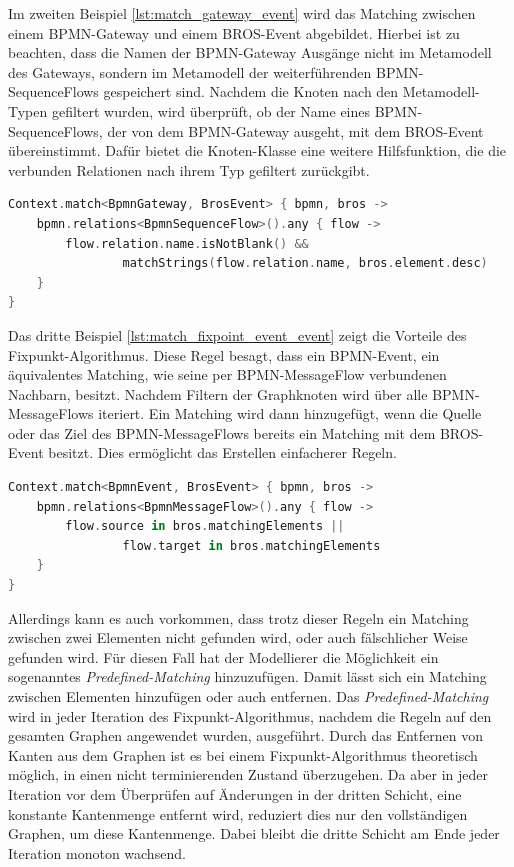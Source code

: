 Im zweiten Beispiel \cref{lst:match_gateway_event} wird das Matching zwischen einem BPMN-Gateway und einem BROS-Event abgebildet.
Hierbei ist zu beachten, dass die Namen der BPMN-Gateway Ausgänge nicht im Metamodell des Gateways, sondern im Metamodell der weiterführenden BPMN-SequenceFlows gespeichert sind.
Nachdem die Knoten nach den Metamodell-Typen gefiltert wurden, wird überprüft, ob der Name eines BPMN-SequenceFlows, der von dem BPMN-Gateway ausgeht, mit dem BROS-Event übereinstimmt.
Dafür bietet die Knoten-Klasse eine weitere Hilfsfunktion, die die verbunden Relationen nach ihrem Typ gefiltert zurückgibt.

\begin{lstlisting}[language=Kotlin, caption=Matching Regel von einem BPMN-Gateway und einem BROS-Event, label=lst:match_gateway_event]
Context.match<BpmnGateway, BrosEvent> { bpmn, bros ->
    bpmn.relations<BpmnSequenceFlow>().any { flow ->
        flow.relation.name.isNotBlank() &&
                matchStrings(flow.relation.name, bros.element.desc)
    }
}
\end{lstlisting}

Das dritte Beispiel \cref{lst:match_fixpoint_event_event} zeigt die Vorteile des Fixpunkt-Algorithmus.
Diese Regel besagt, dass ein BPMN-Event, ein äquivalentes Matching, wie seine per BPMN-MessageFlow verbundenen Nachbarn, besitzt.
Nachdem Filtern der Graphknoten wird über alle BPMN-MessageFlows iteriert.
Ein Matching wird dann hinzugefügt, wenn die Quelle oder das Ziel des BPMN-MessageFlows bereits ein Matching mit dem BROS-Event besitzt.
Dies ermöglicht das Erstellen einfacherer Regeln.

\begin{lstlisting}[language=Kotlin, caption=Fixpunkt Matching Regel von einem BPMN-BpmnEvent und einem BROS-Event, label=lst:match_fixpoint_event_event]
Context.match<BpmnEvent, BrosEvent> { bpmn, bros ->
    bpmn.relations<BpmnMessageFlow>().any { flow ->
        flow.source in bros.matchingElements ||
                flow.target in bros.matchingElements
    }
}
\end{lstlisting}

Allerdings kann es auch vorkommen, dass trotz dieser Regeln ein Matching zwischen zwei Elementen nicht gefunden wird, oder auch fälschlicher Weise gefunden wird.
Für diesen Fall hat der Modellierer die Möglichkeit ein sogenanntes \emph{Predefined-Matching} hinzuzufügen.
Damit lässt sich ein Matching zwischen Elementen hinzufügen oder auch entfernen.
Das \emph{Predefined-Matching} wird in jeder Iteration des Fixpunkt-Algorithmus, nachdem die Regeln auf den gesamten Graphen angewendet wurden, ausgeführt.
Durch das Entfernen von Kanten aus dem Graphen ist es bei einem Fixpunkt-Algorithmus theoretisch möglich, in einen nicht terminierenden Zustand überzugehen.
Da aber in jeder Iteration vor dem Überprüfen auf Änderungen in der dritten Schicht, eine konstante Kantenmenge entfernt wird, reduziert dies nur den vollständigen Graphen, um diese Kantenmenge.
Dabei bleibt die dritte Schicht am Ende jeder Iteration monoton wachsend. 

